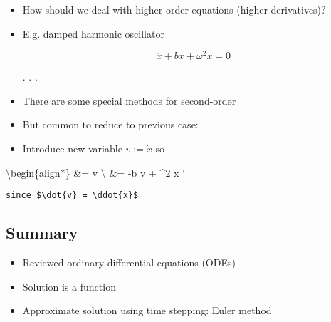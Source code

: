 \documentclass[
]{article}
\begin{document}
\begin{itemize}
\item
  How should we deal with higher-order equations (higher derivatives)?
\item
  E.g. damped harmonic oscillator

  \[\ddot{x} + b \dot{x} + \omega^2 x = 0\]

  . . .
\item
  There are some special methods for second-order
\item
  But common to reduce to previous case:
\item
  Introduce new variable \(v := \dot{x}\) so
\end{itemize}

\textbackslash begin\{align*\}  \&= v \textbackslash{} 
\&= -b v + \omega\^{}2 x `

\begin{verbatim}
since $\dot{v} = \ddot{x}$
\end{verbatim}

\hypertarget{summary}{%
\subsection{Summary}\label{summary}}

\begin{itemize}
\item
  Reviewed ordinary differential equations (ODEs)
\item
  Solution is a function
\item
  Approximate solution using time stepping: Euler method
\end{itemize}
\end{document}
